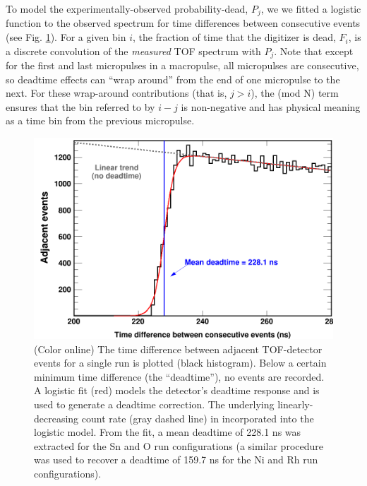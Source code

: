 \documentclass[twocolumn,secnumarabic,amssymb, nobibnotes, aps, prl,
superscriptaddress, nobalancelastpage, draft]{revtex4}
\begin{document}
To model the experimentally-observed probability-dead, $P_{j}$, we
we fitted a logistic function to the observed spectrum for time
differences between consecutive events (see Fig.
\ref{TimeDifferenceBetweenEvents}). For a given bin $i$, the fraction of time that the 
digitizer is dead, $F_{i}$, is a discrete convolution of the
\textit{measured} TOF spectrum with $P_{j}$. Note that except for the first and
last micropulses in a macropulse, all micropulses are consecutive, so deadtime effects can
``wrap around'' from the end of one micropulse to the next. For these wrap-around
contributions (that is, $j>i$), the (mod N) term ensures that the bin referred
to by $i-j$ is non-negative and has physical meaning as a time bin from the 
previous micropulse.
\begin{figure}
    \includegraphics[width=\linewidth]{figures/TimeDifferenceBetweenEvents.png}
    \caption{(Color online) The time difference between adjacent TOF-detector
    events for a single run is plotted (black histogram). Below a certain
minimum time difference (the ``deadtime''), no events are recorded. A logistic
fit (red) models the detector's deadtime response and is used to generate a
deadtime correction. The underlying linearly-decreasing count rate (gray dashed
line) in incorporated into the logistic model. From the fit, a mean deadtime of
228.1 ns was extracted for the Sn and O run configurations (a similar
procedure was used to recover a deadtime of 159.7 ns for the Ni and Rh
run configurations).}
    \label{TimeDifferenceBetweenEvents}
\end{figure}
\end{document}
